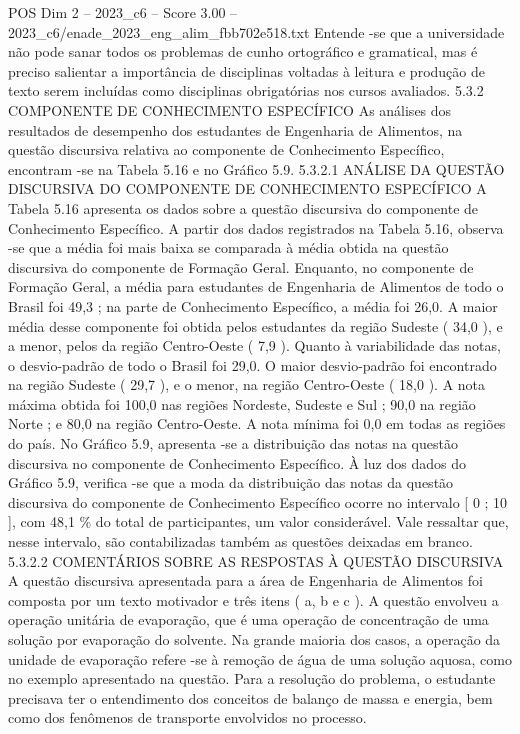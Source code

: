 \begin{textsample}{POS Dim 2 – 2023\_c6 – Score 3.00 – 2023\_c6/enade\_2023\_eng\_alim\_fbb702e518.txt}
Entende -se que a universidade não pode sanar todos os problemas de cunho ortográfico e gramatical, mas é preciso salientar a importância de disciplinas voltadas à leitura e produção de texto serem incluídas como disciplinas obrigatórias nos cursos avaliados. 5.3.2 COMPONENTE DE CONHECIMENTO ESPECÍFICO As análises dos resultados de desempenho dos estudantes de Engenharia de Alimentos, na questão discursiva relativa ao componente de Conhecimento Específico, encontram -se na Tabela 5.16 e no Gráfico 5.9. 5.3.2.1 ANÁLISE DA QUESTÃO DISCURSIVA DO COMPONENTE DE CONHECIMENTO ESPECÍFICO A Tabela 5.16 apresenta os dados sobre a questão discursiva do componente de Conhecimento Específico.
A partir dos dados registrados na Tabela 5.16, observa -se que a média foi mais baixa se comparada à média obtida na questão discursiva do componente de Formação Geral.
Enquanto, no componente de Formação Geral, a média para estudantes de Engenharia de Alimentos de todo o Brasil foi 49,3 ; na parte de Conhecimento Específico, a média foi 26,0.
A maior média desse componente foi obtida pelos estudantes da região Sudeste ( 34,0 ), e a menor, pelos da região Centro-Oeste ( 7,9 ).
Quanto à variabilidade das notas, o desvio-padrão de todo o Brasil foi 29,0.
O maior desvio-padrão foi encontrado na região Sudeste ( 29,7 ), e o menor, na região Centro-Oeste ( 18,0 ).
A nota máxima obtida foi 100,0 nas regiões Nordeste, Sudeste e Sul ; 90,0 na região Norte ; e 80,0 na região Centro-Oeste.
A nota mínima foi 0,0 em todas as regiões do país.
No Gráfico 5.9, apresenta -se a distribuição das notas na questão discursiva no componente de Conhecimento Específico.
À luz dos dados do Gráfico 5.9, verifica -se que a moda da distribuição das notas da questão discursiva do componente de Conhecimento Específico ocorre no intervalo [ 0 ; 10 ], com 48,1 \% do total de participantes, um valor considerável.
Vale ressaltar que, nesse intervalo, são contabilizadas também as questões deixadas em branco. 5.3.2.2 COMENTÁRIOS SOBRE AS RESPOSTAS À QUESTÃO DISCURSIVA A questão discursiva apresentada para a área de Engenharia de Alimentos foi composta por um texto motivador e três itens ( a, b e c ).
A questão envolveu a operação unitária de evaporação, que é uma operação de concentração de uma solução por evaporação do solvente.
Na grande maioria dos casos, a operação da unidade de evaporação refere -se à remoção de água de uma solução aquosa, como no exemplo apresentado na questão.
Para a resolução do problema, o estudante precisava ter o entendimento dos conceitos de balanço de massa e energia, bem como dos fenômenos de transporte envolvidos no processo.

\end{textsample}
